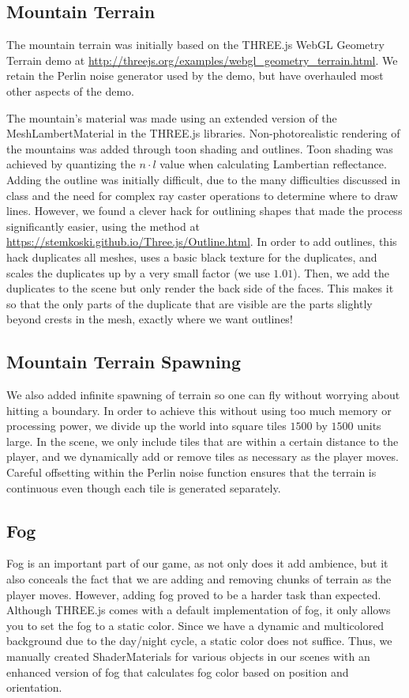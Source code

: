 \documentclass{article}
\begin{document}
\subsection{Mountain Terrain}
The mountain terrain was initially based on the THREE.js WebGL Geometry Terrain demo at \url{http://threejs.org/examples/webgl_geometry_terrain.html}. We retain the Perlin noise generator used by the demo, but have overhauled most other aspects of the demo.

The mountain's material was made using an extended version of the MeshLambertMaterial in the THREE.js libraries. Non-photorealistic rendering of the mountains was added through toon shading and outlines. Toon shading was achieved by quantizing the $n \cdot l$ value when calculating Lambertian reflectance. Adding the outline was initially difficult, due to the many difficulties discussed in class and the need for complex ray caster operations to determine where to draw lines. However, we found a clever hack for outlining shapes that made the process significantly easier, using the method at \url{https://stemkoski.github.io/Three.js/Outline.html}. In order to add outlines, this hack duplicates all meshes, uses a basic black texture for the duplicates, and scales the duplicates up by a very small factor (we use $1.01$). Then, we add the duplicates to the scene but only render the back side of the faces. This makes it so that the only parts of the duplicate that are visible are the parts slightly beyond crests in the mesh, exactly where we want outlines!

\subsection{Mountain Terrain Spawning}
We also added infinite spawning of terrain so one can fly without worrying about hitting a boundary. In order to achieve this without using too much memory or processing power, we divide up the world into square tiles $1500$ by $1500$ units large. In the scene, we only include tiles that are within a certain distance to the player, and we dynamically add or remove tiles as necessary as the player moves. Careful offsetting within the Perlin noise function ensures that the terrain is continuous even though each tile is generated separately.

\subsection{Fog}
Fog is an important part of our game, as not only does it add ambience, but it also conceals the fact that we are adding and removing chunks of terrain as the player moves. However, adding fog proved to be a harder task than expected. Although THREE.js comes with a default implementation of fog, it only allows you to set the fog to a static color. Since we have a dynamic and multicolored background due to the day/night cycle, a static color does not suffice. Thus, we manually created ShaderMaterials for various objects in our scenes with an enhanced version of fog that calculates fog color based on position and orientation.
\end{document}
